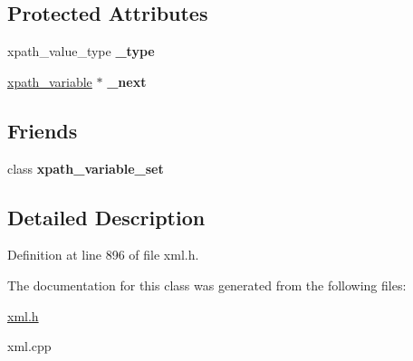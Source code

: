 \subsection*{Protected Attributes}
\begin{DoxyCompactItemize}
\item 
\hypertarget{classphys_1_1xml_1_1xpath__variable_a29973f0177eebe4690cb25b44d3838ec}{
xpath\_\-value\_\-type {\bfseries \_\-type}}
\label{d8/d2c/classphys_1_1xml_1_1xpath__variable_a29973f0177eebe4690cb25b44d3838ec}

\item 
\hypertarget{classphys_1_1xml_1_1xpath__variable_aef4e0368a96faa24ed82c51815d9dae3}{
\hyperlink{classphys_1_1xml_1_1xpath__variable}{xpath\_\-variable} $\ast$ {\bfseries \_\-next}}
\label{d8/d2c/classphys_1_1xml_1_1xpath__variable_aef4e0368a96faa24ed82c51815d9dae3}

\end{DoxyCompactItemize}
\subsection*{Friends}
\begin{DoxyCompactItemize}
\item 
\hypertarget{classphys_1_1xml_1_1xpath__variable_ae065e6f4380a8a530c7352703c09ff80}{
class {\bfseries xpath\_\-variable\_\-set}}
\label{d8/d2c/classphys_1_1xml_1_1xpath__variable_ae065e6f4380a8a530c7352703c09ff80}

\end{DoxyCompactItemize}


\subsection{Detailed Description}


Definition at line 896 of file xml.h.



The documentation for this class was generated from the following files:\begin{DoxyCompactItemize}
\item 
\hyperlink{xml_8h}{xml.h}\item 
xml.cpp\end{DoxyCompactItemize}
